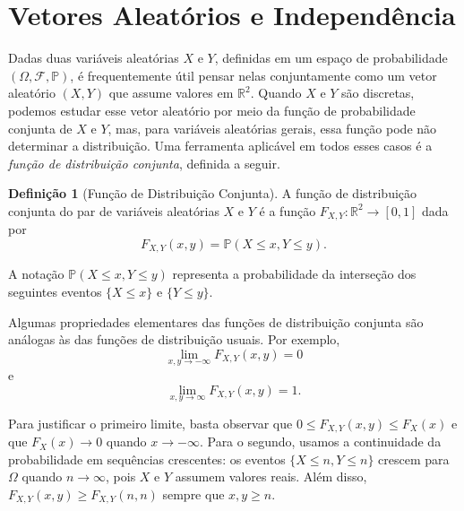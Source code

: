 \documentclass[12pt,portuguese]{article}
\theoremstyle{definition}
\newtheorem{definition}[definition]{Definição}
\theoremstyle{plainexercise}
\theoremstyle{starredexercise}
\theoremstyle{definition}
\begin{document}
\section{Vetores Aleatórios e Independência}\label{sec:vetores-aleatorios}
Dadas duas variáveis aleatórias $X$ e $Y$, definidas em um espaço de
probabilidade $(\Omega, \mathcal{F}, \mathbb{P})$, é frequentemente útil
pensar nelas conjuntamente como um vetor aleatório $(X, Y)$ que assume valores
em $\mathbb{R}^2$. Quando $X$ e $Y$ são discretas, podemos estudar esse
vetor aleatório por meio da função de probabilidade conjunta de $X$ e $Y$,
mas, para variáveis aleatórias gerais, essa função pode não determinar
a distribuição. Uma ferramenta aplicável em todos esses casos é a
\emph{função de distribuição conjunta}, definida a seguir.

\begin{definition}[Função de Distribuição Conjunta]\label{def:funcao-distribuicao-conjunta}
  A função de distribuição conjunta do par de variáveis aleatórias $X$ e $Y$
  é a função $F_{X,Y} : \mathbb{R}^2 \to [0, 1]$ dada por
  \begin{equation}
  \label{eq:def-distribuicao-conjunta}
    F_{X,Y}(x, y) = \mathbb{P}(X \leqslant x, Y \leqslant y).
  \end{equation}
\end{definition}

A notação $\mathbb{P}(X \leqslant x, Y \leqslant y)$ representa a
probabilidade da interseção dos seguintes eventos $\{X \leqslant x\}$ e
$\{Y \leqslant y\}$.

Algumas propriedades elementares das funções de distribuição conjunta
são análogas às das funções de distribuição usuais. Por exemplo,
\begin{equation}
\label{eq:lim-dist-conjunta-menos-infinito}
  \lim_{x,y \to -\infty} F_{X,Y}(x, y) = 0
\end{equation}
e
\begin{equation}
\label{eq:lim-dist-conjunta-mais-infinito}
  \lim_{x,y \to \infty} F_{X,Y}(x, y) = 1.
\end{equation}

Para justificar o primeiro limite, basta observar que
$0 \leqslant F_{X,Y}(x, y) \leqslant F_X(x)$ e que
$F_X(x) \to 0$ quando $x \to -\infty$. Para o segundo, usamos a
continuidade da probabilidade em sequências crescentes: os eventos
$\{X \leqslant n, Y \leqslant n\}$ crescem para $\Omega$ quando
$n \to \infty$, pois $X$ e $Y$ assumem valores reais. Além disso,
$F_{X,Y}(x, y) \geqslant F_{X,Y}(n, n)$ sempre que $x, y \geqslant n$.
\end{document}
